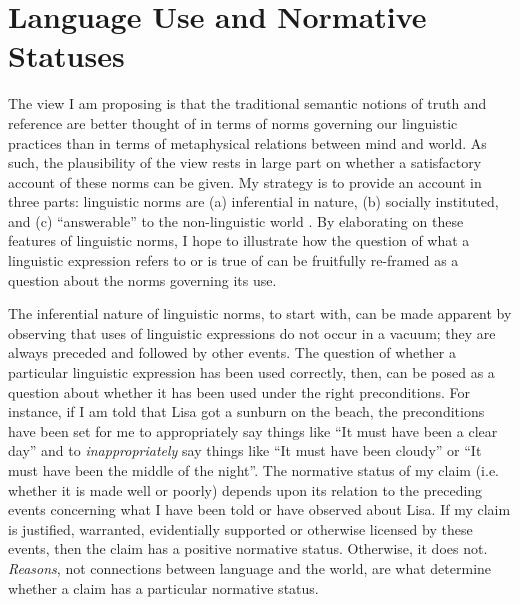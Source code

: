 \section{Language Use and Normative Statuses}

The view I am proposing is that the traditional semantic notions of truth and reference are better thought of in terms of norms governing our linguistic practices than in terms of metaphysical relations between mind and world. As such, the plausibility of the view rests in large part on whether a satisfactory account of these norms can be given. My strategy is to provide an account in three parts: linguistic norms are (a) inferential in nature, (b) socially instituted, and (c) ``answerable'' to the non-linguistic world \citep{Brandom:1994}. By elaborating on these features of linguistic norms, I hope to illustrate how the question of what a linguistic expression refers to or is true of can be fruitfully re-framed as a question about the norms governing its use. 
 
The inferential nature of linguistic norms, to start with, can be made apparent by observing that uses of linguistic expressions do not occur in a vacuum; they are always preceded and followed by other events. The question of whether a particular linguistic expression has been used correctly, then, can be posed as a question about whether it has been used under the right preconditions. For instance, if I am told that Lisa got a sunburn on the beach, the preconditions have been set for me to appropriately say things like ``It must have been a clear day'' and to \textit{inappropriately} say things like ``It must have been cloudy'' or ``It must have been the middle of the night''. The normative status of my claim (i.e. whether it is made well or poorly) depends upon its relation to the preceding events concerning what I have been told or have observed about Lisa. If my claim is justified, warranted, evidentially supported or otherwise licensed by these events, then the claim has a positive normative status. Otherwise, it does not. \textit{Reasons}, not connections between language and the world, are what determine whether a claim has a particular normative status. 

